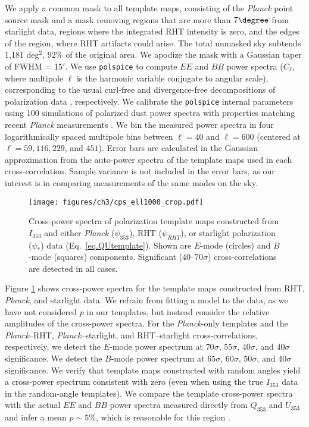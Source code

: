 We apply a common mask to all template maps, consisting of the \textit{Planck} point source mask and a mask removing regions that are more than $7\degree$ from starlight data, regions where the integrated RHT intensity is zero, and the edges of the region, where RHT artifacts could arise. The total unmasked sky subtends 1,181 deg$^2$, 92\% of the original area. We apodize the mask with a Gaussian taper of FWHM = 15$'$. We use {\tt polspice} \cite{Chon:2004tp} to compute $EE$ and $BB$ power spectra ($C_{\ell}$, where multipole $\ell$ is the harmonic variable conjugate to angular scale), corresponding to the usual curl-free and divergence-free decompositions of polarization data \cite{1997PhRvL..78.2054S, Kamionkowski:1997hq}, respectively. We calibrate the {\tt polspice} internal parameters using 100 simulations of polarized dust power spectra with properties matching recent \textit{Planck} measurements \cite{Collaboration:2014wt, Collaboration:2014uh}. We bin the measured power spectra in four logarithmically spaced multipole bins between $\ell=40$ and $\ell=600$ (centered at $\ell=59, 116, 229$, and $451$).  Error bars are calculated in the Gaussian approximation from the auto-power spectra of the template maps used in each cross-correlation.  Sample variance is not included in the error bars, as our interest is in comparing measurements of the same modes on the sky.

\begin{figure}
\centering
\texttt{[image: figures/ch3/cps\_ell1000\_crop.pdf]}
\caption{Cross-power spectra of polarization template maps constructed from $I_{353}$ and either \textit{Planck} ($\psi_{353}$), RHT ($\psi_{RHT}$), or starlight polarization ($\psi_*$) data (Eq.~\ref{eq.QUtemplate}). Shown are $E$-mode (circles) and $B$-mode (squares) components. Significant ($40$--$70\sigma$) cross-correlations are detected in all cases. \label{cps}}
\end{figure}

Figure \ref{cps} shows cross-power spectra for the template maps constructed from RHT, \textit{Planck}, and starlight data.  We refrain from fitting a model to the data, as we have not considered $p$ in our templates, but instead consider the relative amplitudes of the cross-power spectra. 
For the \textit{Planck}-only templates and the \textit{Planck}--RHT, \textit{Planck}--starlight, and RHT--starlight cross-correlations, respectively, we detect the $E$-mode power spectrum at $70\sigma$, $55\sigma$, $40\sigma$, and $40\sigma$ significance. We detect the $B$-mode power spectrum at $65\sigma$, $60\sigma$, $50\sigma$, and $40\sigma$ significance. We verify that template maps constructed with random angles yield a cross-power spectrum consistent with zero (even when using the true $I_{353}$ data in the random-angle templates). We compare the template cross-power spectra with the actual $EE$ and $BB$ power spectra measured directly from $Q_{353}$ and $U_{353}$ and infer a mean $p \sim 5\%$, which is reasonable for this region \cite{Collaboration:2014wt}.

